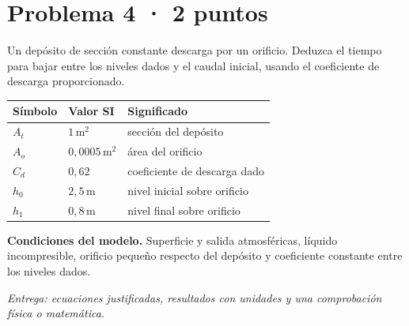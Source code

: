 \par\medskip\noindent\begin{minipage}{\linewidth}

\section{Problema 4 · 2 puntos}

Un depósito de sección constante descarga por un orificio. Deduzca el tiempo para bajar entre los niveles dados y el caudal inicial, usando el coeficiente de descarga proporcionado.

\begin{tabular}{@{}p{.15\linewidth}p{.23\linewidth}p{.54\linewidth}@{}}
\toprule Símbolo & Valor SI & Significado\\\midrule
$A_t$ & $1\,\mathrm{m^2}$ & sección del depósito\\
$A_o$ & $0{,}0005\,\mathrm{m^2}$ & área del orificio\\
$C_d$ & $0{,}62$ & coeficiente de descarga dado\\
$h_0$ & $2{,}5\,\mathrm{m}$ & nivel inicial sobre orificio\\
$h_1$ & $0{,}8\,\mathrm{m}$ & nivel final sobre orificio\\
\bottomrule\end{tabular}

\par\medskip\textbf{Condiciones del modelo.} Superficie y salida atmosféricas, líquido incompresible, orificio pequeño respecto del depósito y coeficiente constante entre los niveles dados.

\par\textit{Entrega: ecuaciones justificadas, resultados con unidades y una comprobación física o matemática.}

\end{minipage}\par\medskip


